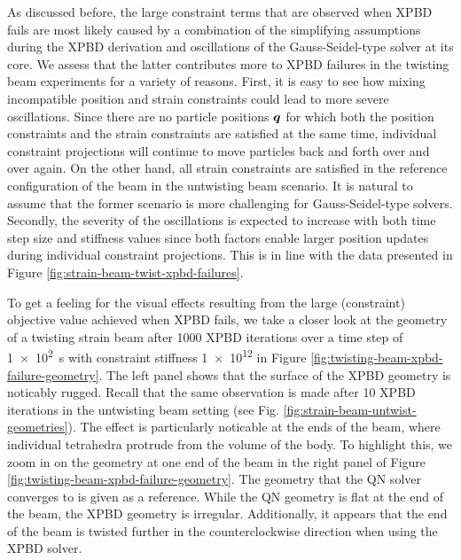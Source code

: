 As discussed before, the large constraint terms that are observed when XPBD fails are most likely caused by a combination of the simplifying 
assumptions during the XPBD derivation and oscillations of the Gauss-Seidel-type solver at its core. We assess that the latter contributes 
more to XPBD failures in the twisting beam experiments for a variety of reasons. First, it is easy to see how mixing incompatible 
position and strain constraints could lead to more severe oscillations. Since there are no particle positions $\bm{q}$ for which both the position constraints and the 
strain constraints are satisfied at the same time, individual constraint projections will continue to move particles back and forth over and over again. 
On the other hand, all strain constraints are satisfied in the reference configuration of the beam in the untwisting beam scenario. It is natural to 
assume that the former scenario is more challenging for Gauss-Seidel-type solvers. Secondly, the severity of the oscillations is expected to increase with both 
time step size and stiffness values since both factors enable larger position updates during individual constraint projections. This is in line with the 
data presented in Figure \ref{fig:strain-beam-twist-xpbd-failures}.

To get a feeling for the visual effects resulting from the large (constraint) objective value achieved when XPBD fails, we take a closer look at the 
geometry of a twisting strain beam after 1000 XPBD iterations over a time step of \SI{1e2}{\second} with constraint stiffness \num{1e12} in 
Figure \ref{fig:twisting-beam-xpbd-failure-geometry}. The left panel shows that the surface of the XPBD geometry is noticably rugged. Recall that 
the same observation is made after 10 XPBD iterations in the untwisting beam setting (see Fig. \ref{fig:strain-beam-untwist-geometries}). The 
effect is particularly noticable at the ends of the beam, where individual tetrahedra protrude from the volume of the body. To highlight this, 
we zoom in on the geometry at one end of the beam in the right panel of Figure \ref{fig:twisting-beam-xpbd-failure-geometry}. The geometry that the QN solver 
converges to is given as a reference. While the QN geometry is flat at the end of the beam, the XPBD geometry is irregular. Additionally, it 
appears that the end of the beam is twisted further in the counterclockwise direction when using the XPBD solver.

